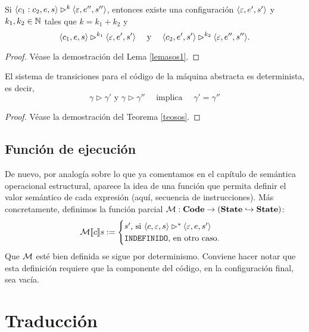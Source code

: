 \begin{lema}
Si $\langle c_1:c_2, e, s \rangle \rhd^k \langle \varepsilon, e'', s'' \rangle$, entonces existe una configuración $\langle \varepsilon, e', s' \rangle$ y $k_1, k_2 \in \mathbb{N}$ tales que $k = k_1 + k_2$ y 
$$\langle c_1, e, s \rangle \rhd^{k_1} \langle \varepsilon, e', s' \rangle \quad\text{ y }\quad \langle c_2, e', s' \rangle \rhd^{k_2} \langle \varepsilon, e'', s'' \rangle.$$
\end{lema}
\begin{proof}
Véase la demostración del Lema \ref{lemasos1}.
\end{proof}

\begin{theorem}
El sistema de transiciones para el código de la máquina abstracta es determinista, es decir, 
$$\gamma \rhd \gamma'  \text{ y }\gamma \rhd \gamma'' \quad \text{ implica } \quad \gamma' = \gamma''$$
\end{theorem}
\begin{proof}
Véase la demostración del Teorema \ref{teosos}.
\end{proof}

\subsection{Función de ejecución}

De nuevo, por analogía sobre lo que ya comentamos en el capítulo de semántica operacional estructural, aparece la idea de una función que  permita definir el valor semántico de cada expresión (aquí, secuencia de instrucciones). Más concretamente, definimos la función parcial $\mathcal{M}: \mathbf{Code} \rightarrow (\mathbf{State} \hookrightarrow \mathbf{State})$:
$$\mathcal{M}[\![c]\!]s := \begin{cases}s' \text{, si } \langle c, \varepsilon, s \rangle\rhd^* \langle \varepsilon, e, s' \rangle\\ \texttt{INDEFINIDO} \text{, en otro caso.}\end{cases}$$
Que $\mathcal{M}$ esté bien definida se sigue por determinismo. Conviene hacer notar que esta definición requiere que la componente del código, en la configuración final, sea vacía.

\section{Traducción}